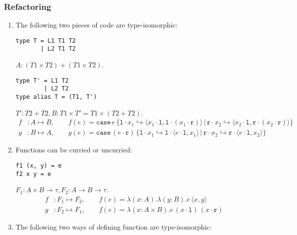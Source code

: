 \documentclass{article}
\theoremstyle{definition}
\newcommand{\ip}[1]{\langle #1 \rangle}
\newcommand{\lp}{\cdot \mathtt{l}}
\newcommand{\rp}{\cdot \mathtt{r}}
\newcommand{\li}{\mathtt{l}\cdot}
\newcommand{\ri}{\mathtt{r}\cdot}
\newcommand{\case}[5]{\mathtt{case}\, #1\, \{\li #2\hookrightarrow #3\, |\, \ri #4\hookrightarrow #5\}}
\begin{document}
\subsubsection*{Refactoring}
\begin{enumerate}
    \item The following two pieces of code are type-isomorphic:
          \begin{mdframed}[backgroundcolor=bg]
              \begin{verbatim}
type T = L1 T1 T2
       | L2 T1 T2
        \end{verbatim}
          \end{mdframed}
          $A:(T1\times T2) +(T1\times T2)$.
          \begin{mdframed}[backgroundcolor=bg]
              \begin{verbatim}
type T' = L1 T2
        | L2 T2
type alias T = (T1, T')
            \end{verbatim}
          \end{mdframed}
          $T':T2 + T2, B: T1 \times T' = T1 \times (T2 + T2)$.
          \begin{align*}
              f & : A\mapsto B,\qquad f(e) = \case{e}{x_1}{\ip{x_1\lp, \li (x_1\rp)}}{x_2}{\ip{x_2\lp, \ri (x_2\rp)}} \\
              g & : B\mapsto A,\qquad g(e) = \case{(e\rp)}{x_1}{\li \ip{e\lp, x_1}}{x_2}{\ri \ip{e\lp, x_2}}
          \end{align*}
    \item Functions can be curried or uncurried:
          \begin{mdframed}[backgroundcolor=bg]
              \begin{verbatim}
f1 (x, y) = e
f2 x y = e
  \end{verbatim}
          \end{mdframed}
          $F_1:A\times B \rightarrow \tau, F_2: A \rightarrow B \rightarrow \tau$.
          \begin{align*}
              f & : F_1 \mapsto F_2,\qquad f(e) = \lambda (x:A).\lambda (y:B).e\, \ip{x, y}  \\
              g & : F_2 \mapsto F_1,\qquad f(e) = \lambda (x: A\times B).e\, (x\lp)\, (x\rp)
          \end{align*}
    \item The following two ways of defining function are type-isomorphic:
          \begin{mdframed}[backgroundcolor=bg]
              \begin{verbatim}

\end{verbatim}
\end{mdframed}
\end{enumerate}
\end{document}
